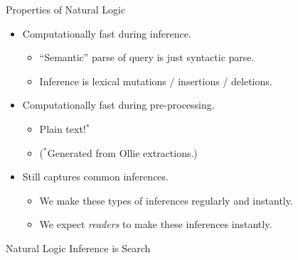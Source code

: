 \documentclass[hyperref]{beamer}
\begin{document}
\begin{frame}{Properties of Natural Logic}
\begin{itemize}
  \item[\green{\checkmark}] Computationally fast during inference.
  \begin{itemize}
    \item ``Semantic'' parse of query is just syntactic parse.
    \item Inference is lexical mutations / insertions / deletions.
  \end{itemize}
  \vspace{0.5cm}
  \pause

  \item[\green{\checkmark}] Computationally fast during pre-processing.
  \begin{itemize}
    \item Plain text!$^*$
    \pause
    \item[] ($^*$Generated from Ollie extractions.)
  \end{itemize}
  \vspace{0.5cm}
  \pause

  \item[\green{\checkmark}] Still captures common inferences.
  \begin{itemize}
    \item We make these types of inferences regularly and instantly.
    \pause
    \item We expect \textit{readers} to make these inferences instantly.
  \end{itemize}
\end{itemize}
\end{frame}


\begin{frame}{Natural Logic Inference is Search}
  \teaserFullDerivation
\end{frame}
\end{document}
